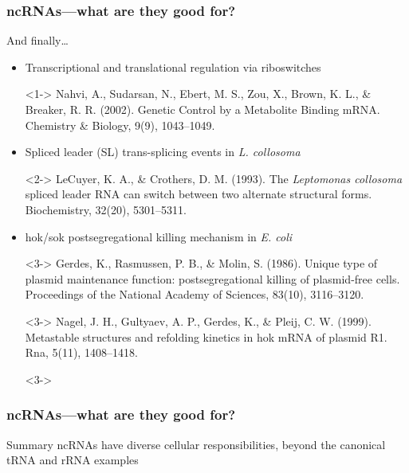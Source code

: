 \documentclass{beamer}
\begin{document}
\begin{frame}
  \frametitle{ncRNAs---what are they good for?}

  And finally\dots
  \begin{itemize}
  \item<1-> Transcriptional and translational regulation via riboswitches
  \item[]<1-> \scriptsize Nahvi, A., Sudarsan, N., Ebert, M. S., Zou, X., Brown, K. L., \& Breaker, R. R. (2002). Genetic Control by a Metabolite Binding mRNA. Chemistry \& Biology, 9(9), 1043--1049.
  \item<2-> Spliced leader (SL) trans-splicing events in {\em L. collosoma}
  \item[]<2-> \scriptsize LeCuyer, K. A., \& Crothers, D. M. (1993). The {\em Leptomonas collosoma} spliced leader RNA can switch between two alternate structural forms. Biochemistry, 32(20), 5301--5311.
  \item<3-> hok/sok postsegregational killing mechanism in {\em E. coli}
  \item[]<3-> \scriptsize Gerdes, K., Rasmussen, P. B., \& Molin, S. (1986). Unique type of plasmid maintenance function: postsegregational killing of plasmid-free cells. Proceedings of the National Academy of Sciences, 83(10), 3116--3120.
  \item[]<3-> \scriptsize Nagel, J. H., Gultyaev, A. P., Gerdes, K., \& Pleij, C. W. (1999). Metastable structures and refolding kinetics in hok mRNA of plasmid R1. Rna, 5(11), 1408--1418.
  \item[]<3->
  \end{itemize}
\end{frame}

\begin{frame}
  \frametitle{ncRNAs---what are they good for?}

  \begin{block}{Summary}
  ncRNAs have diverse cellular responsibilities, beyond the canonical tRNA and rRNA examples
  \end{block}

\end{frame}

\end{document}
